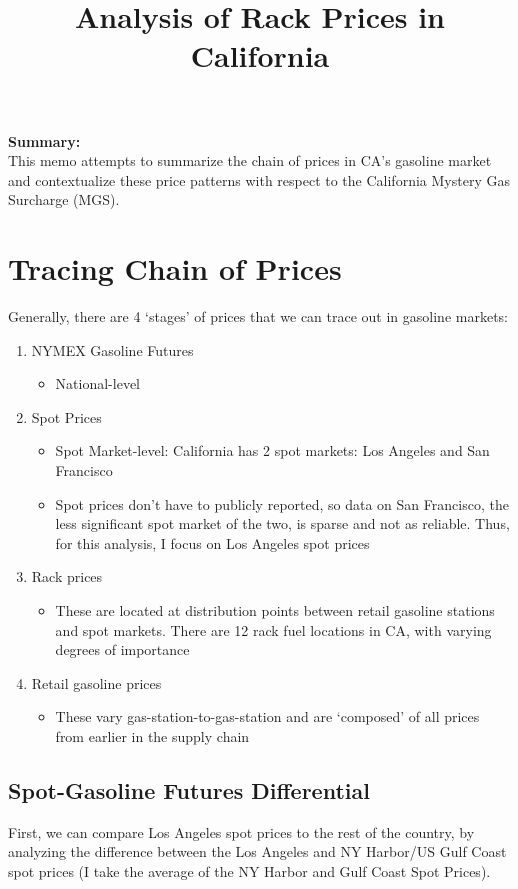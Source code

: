 \documentclass{article}
\begin{document}
\title{Analysis of Rack Prices in California} 

\maketitle

\noindent \textbf{Summary:} \\
This memo attempts to summarize the chain of prices in CA's gasoline market and contextualize these price patterns with respect to the California Mystery Gas Surcharge (MGS).

\section{Tracing Chain of Prices}

Generally, there are 4 `stages' of prices that we can trace out in gasoline markets: 
\begin{enumerate} 
	\item NYMEX Gasoline Futures
	\begin{itemize}
		\item National-level
	\end{itemize}
	\item Spot Prices 
	\begin{itemize}
		\item Spot Market-level: California has 2 spot markets: Los Angeles and San Francisco
		\item Spot prices don't have to publicly reported, so data on San Francisco, the less significant spot market of the two, is sparse and not as reliable. Thus, for this analysis, I focus on Los Angeles spot prices
	\end{itemize}
	\item Rack prices 
	\begin{itemize}
		\item These are located at distribution points between retail gasoline stations and spot markets. There are 12 rack fuel locations in CA, with varying degrees of importance
	\end{itemize}
	\item Retail gasoline prices
	\begin{itemize}
		\item These vary gas-station-to-gas-station and are `composed' of all prices from earlier in the supply chain
	\end{itemize}
\end{enumerate}

\subsection{Spot-Gasoline Futures Differential}
First, we can compare Los Angeles spot prices to the rest of the country, by analyzing the difference between the Los Angeles and NY Harbor/US Gulf Coast spot prices (I take the average of the NY Harbor and Gulf Coast Spot Prices). 
\end{document}

